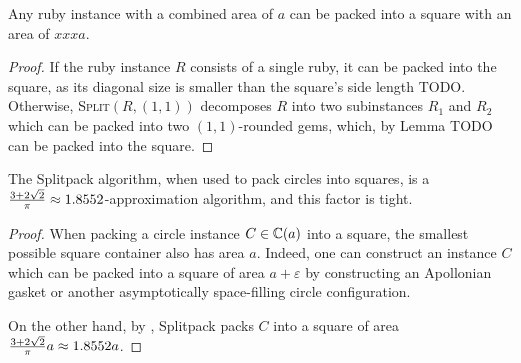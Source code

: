 \documentclass[a4paper,style=print,bibliography=totoc,nexus,lnum,extramargin]{tubsbook}
\begin{document}
%
%

\begin{theorem}\label{th:square}
    Any ruby instance with a combined area of $a$ can be packed into a square with an area of $xxx a$.
\end{theorem}

\begin{proof}
    If the ruby instance $R$ consists of a single ruby, it can be packed into the square, as its diagonal size is smaller than the square's side length TODO.
    Otherwise, \textsc{Split}$(R, (1,1))$ decomposes $R$ into two subinstances $R_1$ and $R_2$ which can be packed into two $(1,1)$-rounded gems, which, by Lemma TODO can be packed into the square.
\end{proof}

\begin{theorem}
    The Splitpack algorithm, when used to pack circles into squares, is a $\frac{3+2\sqrt{2}}{\pi} \approx 1.8552$-approximation algorithm, and this factor is tight.
\end{theorem}

\begin{proof}
    When packing a circle instance $C \in \mathbb{C}(a)$ into a square, the smallest possible square container also has area $a$. Indeed, one can construct an instance $C$ which can be packed into a square of area $a+\varepsilon$ by constructing an Apollonian gasket or another asymptotically space-filling circle configuration.

    On the other hand, by , Splitpack packs $C$ into a square of area $\frac{3+2\sqrt{2}}{\pi}a \approx 1.8552a$.
\end{proof}
\end{document}
